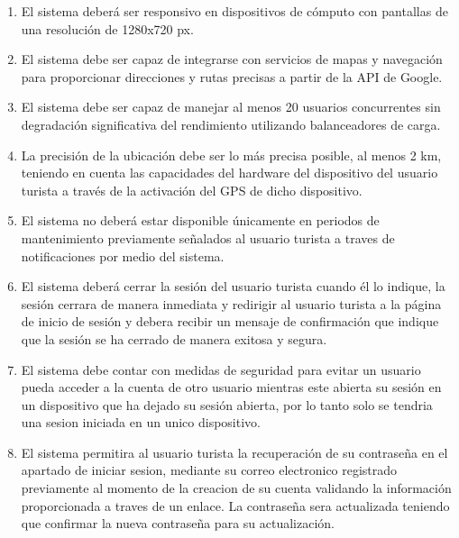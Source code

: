 \documentclass{article}
\begin{document}
\begin{enumerate}
    \item El sistema deberá ser responsivo en dispositivos de cómputo con pantallas de una resolución de 1280x720 px.
    
    \item El sistema debe ser capaz de integrarse con servicios de mapas y navegación para proporcionar direcciones y rutas precisas a partir de la API de Google.
    
    \item El sistema debe ser capaz de manejar al menos 20 usuarios concurrentes sin degradación significativa del rendimiento utilizando balanceadores de carga.
    
    \item La precisión de la ubicación debe ser lo más precisa posible, al menos 2 km, teniendo en cuenta las capacidades del hardware del dispositivo del usuario turista a través de la activación del GPS de dicho dispositivo.
    
    \item El sistema no deberá estar disponible únicamente en periodos de mantenimiento previamente señalados al usuario turista a traves de notificaciones por medio del sistema.
    
    \item El sistema deberá cerrar la sesión del usuario turista cuando él lo indique, la sesión cerrara de manera inmediata y redirigir al usuario turista a la página de inicio de sesión y debera recibir un mensaje de confirmación que indique que la sesión se ha cerrado de manera exitosa y segura. 
    
    \item El sistema debe contar con medidas de seguridad para evitar un usuario pueda acceder a la cuenta de otro usuario mientras este abierta su sesión en un dispositivo que ha dejado su sesión abierta, por lo tanto solo se tendria una sesion iniciada en un unico dispositivo.
    

\item  El sistema permitira al usuario turista la recuperación de su contraseña en el apartado de iniciar sesion, mediante su correo electronico registrado previamente al momento de la creacion de su cuenta validando la información proporcionada a traves de un enlace. La contraseña sera actualizada teniendo que confirmar la nueva contraseña para su actualización.
\end{enumerate}
\end{document}
